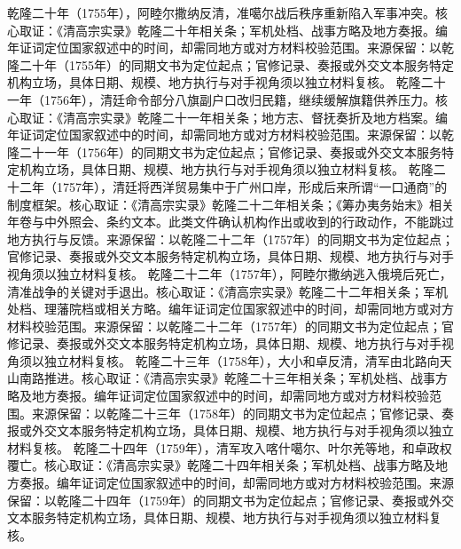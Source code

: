 乾隆二十年（1755年），阿睦尔撒纳反清，准噶尔战后秩序重新陷入军事冲突。核心取证：《清高宗实录》乾隆二十年相关条；军机处档、战事方略及地方奏报。编年证词定位国家叙述中的时间，却需同地方或对方材料校验范围。来源保留：以乾隆二十年（1755年）的同期文书为定位起点；官修记录、奏报或外交文本服务特定机构立场，具体日期、规模、地方执行与对手视角须以独立材料复核。
乾隆二十一年（1756年），清廷命令部分八旗副户口改归民籍，继续缓解旗籍供养压力。核心取证：《清高宗实录》乾隆二十一年相关条；地方志、督抚奏折及地方档案。编年证词定位国家叙述中的时间，却需同地方或对方材料校验范围。来源保留：以乾隆二十一年（1756年）的同期文书为定位起点；官修记录、奏报或外交文本服务特定机构立场，具体日期、规模、地方执行与对手视角须以独立材料复核。
乾隆二十二年（1757年），清廷将西洋贸易集中于广州口岸，形成后来所谓“一口通商”的制度框架。核心取证：《清高宗实录》乾隆二十二年相关条；《筹办夷务始末》相关年卷与中外照会、条约文本。此类文件确认机构作出或收到的行政动作，不能跳过地方执行与反馈。来源保留：以乾隆二十二年（1757年）的同期文书为定位起点；官修记录、奏报或外交文本服务特定机构立场，具体日期、规模、地方执行与对手视角须以独立材料复核。
乾隆二十二年（1757年），阿睦尔撒纳逃入俄境后死亡，清准战争的关键对手退出。核心取证：《清高宗实录》乾隆二十二年相关条；军机处档、理藩院档或相关方略。编年证词定位国家叙述中的时间，却需同地方或对方材料校验范围。来源保留：以乾隆二十二年（1757年）的同期文书为定位起点；官修记录、奏报或外交文本服务特定机构立场，具体日期、规模、地方执行与对手视角须以独立材料复核。
乾隆二十三年（1758年），大小和卓反清，清军由北路向天山南路推进。核心取证：《清高宗实录》乾隆二十三年相关条；军机处档、战事方略及地方奏报。编年证词定位国家叙述中的时间，却需同地方或对方材料校验范围。来源保留：以乾隆二十三年（1758年）的同期文书为定位起点；官修记录、奏报或外交文本服务特定机构立场，具体日期、规模、地方执行与对手视角须以独立材料复核。
乾隆二十四年（1759年），清军攻入喀什噶尔、叶尔羌等地，和卓政权覆亡。核心取证：《清高宗实录》乾隆二十四年相关条；军机处档、战事方略及地方奏报。编年证词定位国家叙述中的时间，却需同地方或对方材料校验范围。来源保留：以乾隆二十四年（1759年）的同期文书为定位起点；官修记录、奏报或外交文本服务特定机构立场，具体日期、规模、地方执行与对手视角须以独立材料复核。
